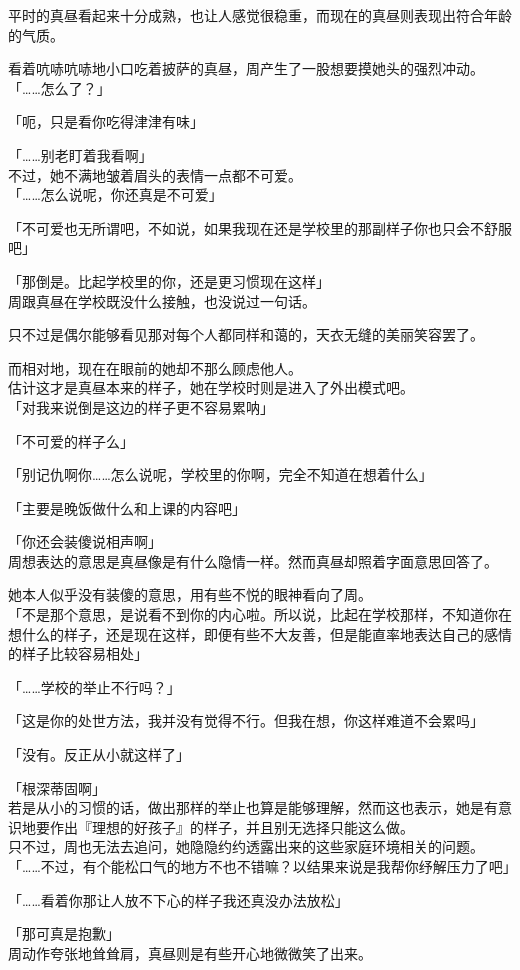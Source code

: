 平时的真昼看起来十分成熟，也让人感觉很稳重，而现在的真昼则表现出符合年龄的气质。

看着吭哧吭哧地小口吃着披萨的真昼，周产生了一股想要摸她头的强烈冲动。\\

「……怎么了？」

「呃，只是看你吃得津津有味」

「……别老盯着我看啊」\\

不过，她不满地皱着眉头的表情一点都不可爱。\\

「……怎么说呢，你还真是不可爱」

「不可爱也无所谓吧，不如说，如果我现在还是学校里的那副样子你也只会不舒服吧」

「那倒是。比起学校里的你，还是更习惯现在这样」\\

周跟真昼在学校既没什么接触，也没说过一句话。

只不过是偶尔能够看见那对每个人都同样和蔼的，天衣无缝的美丽笑容罢了。

而相对地，现在在眼前的她却不那么顾虑他人。\\

估计这才是真昼本来的样子，她在学校时则是进入了外出模式吧。\\

「对我来说倒是这边的样子更不容易累呐」

「不可爱的样子么」

「别记仇啊你……怎么说呢，学校里的你啊，完全不知道在想着什么」

「主要是晚饭做什么和上课的内容吧」

「你还会装傻说相声啊」\\

周想表达的意思是真昼像是有什么隐情一样。然而真昼却照着字面意思回答了。

她本人似乎没有装傻的意思，用有些不悦的眼神看向了周。\\

「不是那个意思，是说看不到你的内心啦。所以说，比起在学校那样，不知道你在想什么的样子，还是现在这样，即便有些不大友善，但是能直率地表达自己的感情的样子比较容易相处」

「……学校的举止不行吗？」

「这是你的处世方法，我并没有觉得不行。但我在想，你这样难道不会累吗」

「没有。反正从小就这样了」

「根深蒂固啊」\\

若是从小的习惯的话，做出那样的举止也算是能够理解，然而这也表示，她是有意识地要作出『理想的好孩子』的样子，并且别无选择只能这么做。\\

只不过，周也无法去追问，她隐隐约约透露出来的这些家庭环境相关的问题。\\

「……不过，有个能松口气的地方不也不错嘛？以结果来说是我帮你纾解压力了吧」

「……看着你那让人放不下心的样子我还真没办法放松」

「那可真是抱歉」\\

周动作夸张地耸耸肩，真昼则是有些开心地微微笑了出来。
